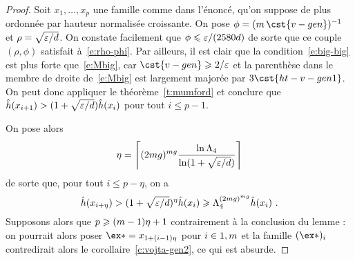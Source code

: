 \begin{proof}
  Soit \( x_1, \dots, x_p \) une famille comme dans l'énoncé, qu'on suppose de
  plus ordonnée par hauteur normalisée croissante. On pose
  \( \phi =( \puiss \, \cst{v-gen})^{-1} \) et
  \( \rho = \sqrt{ \varepsilon / d } \).  On constate facilement que
  \( \phi \leqslant \varepsilon / (2580 d) \) de sorte que ce couple \( (\rho, \phi) \)
  satisfait à~\eqref{e:rho-phi}. Par ailleurs, il est clair que la
  condition~\eqref{e:big-big} est plus forte que~\eqref{e:Mbig}, car \(
    \cst{v-gen} \ge 2/\expapx \) et la parenthèse dans le membre de droite
  de~\eqref{e:Mbig} est largement majorée par \( 3 \cst{ht-v-gen1}
  \). On peut donc
  appliquer le théorème~\ref{t:mumford} et conclure que
  \( \hat h ( x_{i+1} ) > (1 + \sqrt{\varepsilon / d}) \hat h ( x_i ) \) pour tout
  \( i \le p-1 \).

  On pose alors
  \begin{equation}
    \eta
    =
    \left\lceil
      (2mg)^{mg}
      \frac{ \ln \Lambda_4 }{ \ln (1 + \sqrt{\varepsilon / d}) }
    \right\rceil
  \end{equation}
  de sorte que, pour tout \( i \le p - \eta \), on a
  \begin{equation}
    \hat h ( x_{i+\eta} )
    >
    (1 + \sqrt{\varepsilon / d})^\eta
    \hat h ( x_i )
    \geqslant
    \Lambda_4^{(2mg)^{mg}}
    \hat h ( x_i )
    \text{ .}
  \end{equation}
  Supposons alors que \( p \geqslant (m - 1) \eta + 1 \) contrairement à la
  conclusion du lemme : on pourrait alors poser \( \ex* = x_{1 + (\fct-1)
      \eta} \) pour \( i \in {1, m} \) et la famille \( (\ex*)_\fct \)
  contredirait alors le corollaire~\ref{c:vojta-gen2}, ce qui est absurde.


\end{proof}
